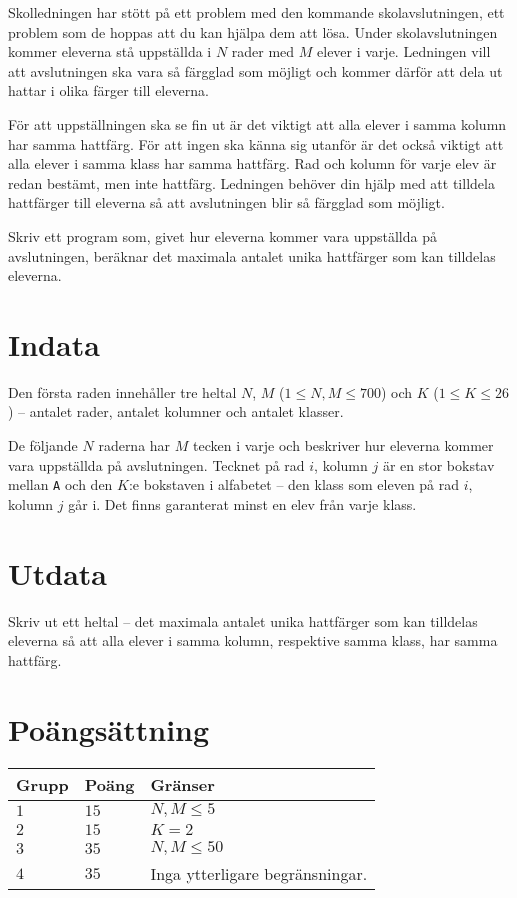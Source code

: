 Skolledningen har stött på ett problem med den kommande skolavslutningen, ett problem
som de hoppas att du kan hjälpa dem att lösa. Under skolavslutningen kommer
eleverna stå uppställda i $N$ rader med $M$ elever i varje. Ledningen vill att
avslutningen ska vara så färgglad som möjligt och kommer därför att dela ut
hattar i olika färger till eleverna.

För att uppställningen ska se fin ut är det viktigt att alla elever i samma
kolumn har samma hattfärg. För att ingen ska känna sig utanför är det också
viktigt att alla elever i samma klass har samma hattfärg. Rad och kolumn för
varje elev är redan bestämt, men inte hattfärg. Ledningen behöver din hjälp
med att tilldela hattfärger till eleverna så att avslutningen blir så
färgglad som möjligt.

Skriv ett program som, givet hur eleverna kommer vara uppställda på
avslutningen, beräknar det maximala antalet unika hattfärger som kan tilldelas
eleverna.

\section*{Indata}
Den första raden innehåller tre heltal $N$, $M$ ($1 \leq N, M \leq 700$) och
$K$ ($1 \leq K \leq 26$) -- antalet rader, antalet kolumner och antalet klasser.

De följande $N$ raderna har $M$ tecken i varje och beskriver hur eleverna kommer
vara uppställda på avslutningen. Tecknet på rad $i$, kolumn $j$ är en stor
bokstav mellan \texttt{A} och den $K$:e bokstaven i alfabetet -- den klass som eleven på
rad $i$, kolumn $j$ går i. Det finns garanterat minst en elev från varje klass.

\section*{Utdata}
Skriv ut ett heltal -- det maximala antalet unika hattfärger som kan tilldelas
eleverna så att alla elever i samma kolumn, respektive samma klass, har samma
hattfärg.

\section*{Poängsättning}
\begin{tabular}{| l | l | l |} \hline
Grupp & Poäng & Gränser \\ \hline
$1$    & $15$    & $N, M \leq 5 $ \\ \hline
$2$    & $15$    & $K = 2$ \\ \hline
$3$    & $35$    & $N, M \leq 50 $ \\ \hline
$4$    & $35$    & Inga ytterligare begränsningar. \\ \hline
\end{tabular}


